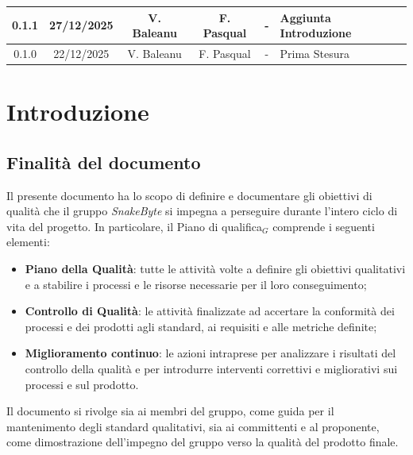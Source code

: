 \documentclass[10pt, letterpaper]{article}
\begin{document}
\begin{center}
\begin{tabularx}{\textwidth}{|c|c|c|c|c|X|}
        \hline
        0.1.1                                  & 27/12/2025    & V. Baleanu      & F. Pasqual               & -                    & Aggiunta Introduzione                                                                         \\
        \hline
        0.1.0                                  & 22/12/2025    & V. Baleanu      & F. Pasqual               & -                    & Prima Stesura                                                                                 \\
        \hline
    \end{tabularx}
\end{center}

\newpage

\tableofcontents

\newpage
\listoffigures
\newpage
\listoftables
\newpage

\section{Introduzione}
\subsection{Finalità del documento}
Il presente documento ha lo scopo di definire e documentare gli obiettivi di qualità
che il gruppo \textit{SnakeByte} si impegna a perseguire durante l'intero ciclo di vita del
progetto. In particolare, il Piano di qualifica${_G}$ comprende i seguenti elementi:
\begin{itemize}
    \item \textbf{Piano della Qualità}: tutte le attività volte a definire gli obiettivi
          qualitativi e a stabilire i processi e le risorse necessarie per il loro conseguimento;
    \item \textbf{Controllo di Qualità}: le attività finalizzate ad accertare la conformità dei processi
          e dei prodotti agli standard, ai requisiti e alle metriche definite;
    \item \textbf{Miglioramento continuo}: le azioni intraprese per analizzare i risultati
          del controllo della qualità e per introdurre interventi correttivi e migliorativi
          sui processi e sul prodotto.
\end{itemize}
Il documento si rivolge sia ai membri del gruppo, come guida per il mantenimento
degli standard qualitativi, sia ai committenti e al proponente, come dimostrazione
dell'impegno del gruppo verso la qualità del prodotto finale.
\end{document}
